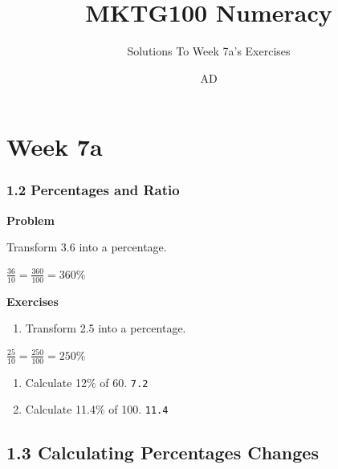 \documentclass[
  letterpaper,
  DIV=11,
  numbers=noendperiod]{scrartcl}
\title{MKTG100 Numeracy}
\subtitle{Solutions To Week 7a's Exercises}
\author{AD}
\date{}
\providecommand{\tightlist}{%
  \setlength{\itemsep}{0pt}\setlength{\parskip}{0pt}}\usepackage{longtable,booktabs,array}
\renewcommand*\contentsname{Table of contents}
\newcommand\contentsname{Table of contents}
\begin{document}
\maketitle
\ifdefined\Shaded\renewenvironment{Shaded}{\begin{tcolorbox}[breakable, enhanced, interior hidden, boxrule=0pt, sharp corners, frame hidden, borderline west={3pt}{0pt}{shadecolor}]}{\end{tcolorbox}}\fi

\renewcommand*\contentsname{Table of contents}
{
\hypersetup{linkcolor=}
\setcounter{tocdepth}{3}
\tableofcontents
}
\hypertarget{week-7a}{%
\section*{Week 7a}\label{week-7a}}

\hypertarget{percentages-and-ratio}{%
\subsubsection*{1.2 Percentages and Ratio}\label{percentages-and-ratio}}

\textbf{Problem}

Transform 3.6 into a percentage.

\(\frac{36}{10}=\frac{360}{100}=360 \%\)

\textbf{Exercises}

\begin{enumerate}
\def\labelenumi{\arabic{enumi}.}
\tightlist
\item
  Transform 2.5 into a percentage.
\end{enumerate}

\(\frac{25}{10}=\frac{250}{100}=250 \%\)

\begin{enumerate}
\def\labelenumi{\arabic{enumi}.}
\setcounter{enumi}{1}
\item
  Calculate 12\% of 60. \texttt{7.2}
\item
  Calculate 11.4\% of 100. \texttt{11.4}
\end{enumerate}

\hypertarget{calculating-percentages-changes}{%
\subsection*{1.3 Calculating Percentages
Changes}\label{calculating-percentages-changes}}
\end{document}
